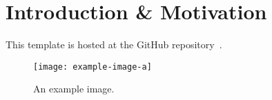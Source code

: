 \section{Introduction \& Motivation}

This template is hosted at the GitHub repository~\cite{mizutani2021interactions-template}.

\lipsum[1]

\begin{figure}[ht!]
\texttt{[image: example-image-a]}
\caption{An example image.}
\label{fig:example}
\end{figure}

\lipsum
